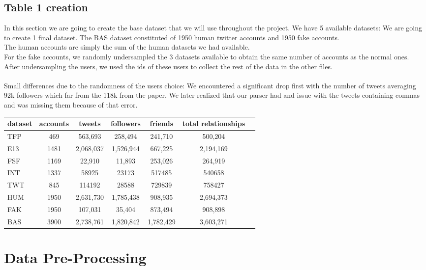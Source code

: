 \documentclass[a4paper,11pt]{article}
\begin{document}
\subsection{Table 1 creation}
In this section we are going to create the base dataset that we will use throughout the project.
We have 5 available datasets: 
We are going to create 1 final dataset. The BAS dataset constituted of 1950 human twitter accounts and 1950 fake accounts.\\ The human accounts are simply the sum of the human datasets we had available.\\
For the fake accounts, we randomly undersampled the 3 datasets available to obtain the same number of accounts as the normal ones.\\
After undersampling the users, we used the ids of these users to collect the rest of the data in the other files.\\\\
Small differences due to the randomness of the users choice:
We encountered a significant drop first with the number of tweets averaging 92k followers which far from the 118k from the paper. We later realized that our parser had and issue with the tweets containing commas and was missing them because of that error.\\

\begin{tabular}{lcccccc}
dataset & accounts & tweets & followers & friends & total relationships \\
\hline
TFP & 469 & 563,693 & 258,494 & 241,710 & 500,204 \\
E13 & 1481 & 2,068,037 & 1,526,944 & 667,225 & 2,194,169 \\
FSF & 1169 & 22,910 & 11,893 & 253,026 & 264,919 \\
INT & 1337 & 58925 & 23173 & 517485 & 540658 \\
TWT & 845 & 114192 & 28588 & 729839 & 758427 \\
\hline
HUM & 1950 & 2,631,730 & 1,785,438 & 908,935 & 2,694,373 \\
FAK & 1950 & 107,031 & 35,404 & 873,494 & 908,898 \\
\hline
BAS & 3900 & 2,738,761 & 1,820,842 & 1,782,429 & 3,603,271 \\
\end{tabular}


\section{Data Pre-Processing}





\end{document}
